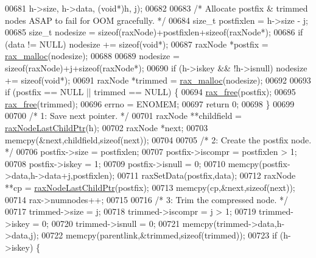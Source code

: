 \begin{DoxyCode}
{{{{{{{{{{{00681             h->size, h->data, (\textcolor{keywordtype}{void}*)h, j);
00682 
00683         \textcolor{comment}{/* Allocate postfix & trimmed nodes ASAP to fail for OOM gracefully. */}
00684         size\_t postfixlen = h->size - j;
00685         size\_t nodesize = \textcolor{keyword}{sizeof}(raxNode)+postfixlen+\textcolor{keyword}{sizeof}(raxNode*);
00686         \textcolor{keywordflow}{if} (data != NULL) nodesize += \textcolor{keyword}{sizeof}(\textcolor{keywordtype}{void}*);
00687         raxNode *postfix = \hyperlink{rax__malloc_8h_aba4b5d6a50f54903fe9c330308beb66a}{rax\_malloc}(nodesize);
00688 
00689         nodesize = \textcolor{keyword}{sizeof}(raxNode)+j+\textcolor{keyword}{sizeof}(raxNode*);
00690         \textcolor{keywordflow}{if} (h->iskey && !h->isnull) nodesize += \textcolor{keyword}{sizeof}(\textcolor{keywordtype}{void}*);
00691         raxNode *trimmed = \hyperlink{rax__malloc_8h_aba4b5d6a50f54903fe9c330308beb66a}{rax\_malloc}(nodesize);
00692 
00693         \textcolor{keywordflow}{if} (postfix == NULL || trimmed == NULL) \{
00694             \hyperlink{rax__malloc_8h_a3adfa16bca6cd23b6e125fd441465e49}{rax\_free}(postfix);
00695             \hyperlink{rax__malloc_8h_a3adfa16bca6cd23b6e125fd441465e49}{rax\_free}(trimmed);
00696             errno = ENOMEM;
00697             \textcolor{keywordflow}{return} 0;
00698         \}
00699 
00700         \textcolor{comment}{/* 1: Save next pointer. */}
00701         raxNode **childfield = \hyperlink{rax_8c_a2c5310b0d00672508a8f935a7109f4ce}{raxNodeLastChildPtr}(h);
00702         raxNode *next;
00703         memcpy(&next,childfield,\textcolor{keyword}{sizeof}(next));
00704 
00705         \textcolor{comment}{/* 2: Create the postfix node. */}
00706         postfix->size = postfixlen;
00707         postfix->iscompr = postfixlen > 1;
00708         postfix->iskey = 1;
00709         postfix->isnull = 0;
00710         memcpy(postfix->data,h->data+j,postfixlen);
00711         raxSetData(postfix,data);
00712         raxNode **cp = \hyperlink{rax_8c_a2c5310b0d00672508a8f935a7109f4ce}{raxNodeLastChildPtr}(postfix);
00713         memcpy(cp,&next,\textcolor{keyword}{sizeof}(next));
00714         rax->numnodes++;
00715 
00716         \textcolor{comment}{/* 3: Trim the compressed node. */}
00717         trimmed->size = j;
00718         trimmed->iscompr = j > 1;
00719         trimmed->iskey = 0;
00720         trimmed->isnull = 0;
00721         memcpy(trimmed->data,h->data,j);
00722         memcpy(parentlink,&trimmed,\textcolor{keyword}{sizeof}(trimmed));
00723         \textcolor{keywordflow}{if} (h->iskey) \{
}}}}}}}}}}}
\end{DoxyCode}
